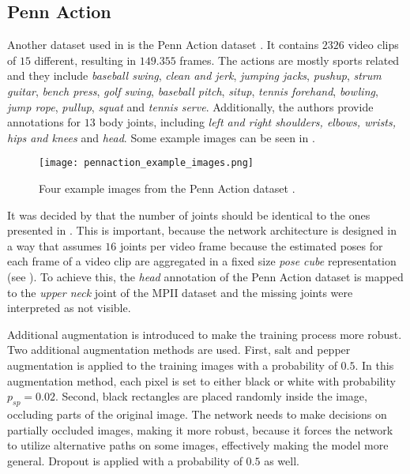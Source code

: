 \subsection{Penn Action}
\label{sec:exp-penn}

Another dataset used in \cite{luvizon_2d/3d_2018} is the Penn Action dataset \cite{zhang_actemes_2013}.
It contains $2326$ video clips of $15$ different, resulting in $149.355$ frames.
The actions are mostly sports related and they include \textit{baseball swing}, \textit{clean and jerk}, \textit{jumping jacks}, \textit{pushup}, \textit{strum guitar}, \textit{bench press}, \textit{golf swing}, \textit{baseball pitch}, \textit{situp}, \textit{tennis forehand}, \textit{bowling}, \textit{jump rope}, \textit{pullup}, \textit{squat} and \textit{tennis serve}.
Additionally, the authors provide annotations for $13$ body joints,
including \textit{left and right shoulders, elbows, wrists, hips and knees} and \textit{head}.
Some example images can be seen in . 

\begin{figure}[htb!]
    \centering
    \texttt{[image: pennaction\_example\_images.png]}
    \caption{Four example images from the Penn Action dataset \cite{zhang_actemes_2013}. }
    \label{fig:pennaction_example_images}
\end{figure}

It was decided by \cite{luvizon_2d/3d_2018} that the number of joints should be identical to the ones presented in \cite{andriluka_2d_2014} .
This is important, because the network architecture is designed in a way that assumes $16$ joints per video frame because the estimated poses for each frame of a video clip are aggregated in a fixed size \textit{pose cube} representation (see ).
To achieve this, the \textit{head} annotation of the Penn Action dataset is mapped to the \textit{upper neck} joint of the MPII dataset and the missing joints were interpreted as not visible.

Additional augmentation is introduced to make the training process more robust.
Two additional augmentation methods are used.
First, salt and pepper augmentation is applied to the training images with a probability of $0.5$.
In this augmentation method, each pixel is set to either black or white with probability $p_{sp} = 0.02$.
Second, black rectangles are placed randomly inside the image, occluding parts of the original image.
The network needs to make decisions on partially occluded images, making it more robust, because it forces the network to utilize alternative paths on some images, effectively making the model more general.
Dropout is applied with a probability of $0.5$ as well.

